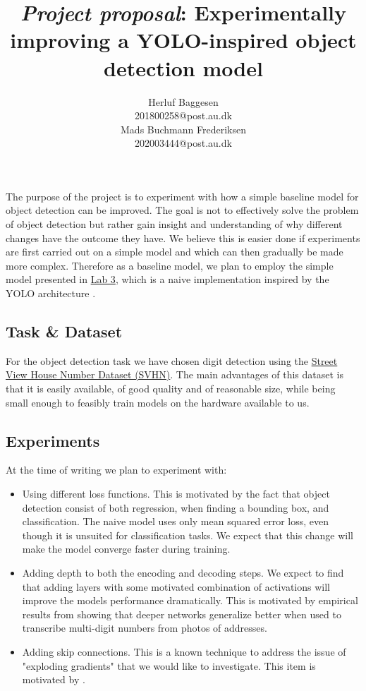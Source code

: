 \documentclass{article}
\title{\emph{Project proposal}: Experimentally improving a YOLO-inspired object detection model}
\author{
	Herluf Baggesen \\
	201800258@post.au.dk \\
	\And
	Mads Buchmann Frederiksen \\
	202003444@post.au.dk\\
}
\date{}
\begin{document}
\maketitle

The purpose of the project is to experiment with how a simple baseline model for object detection can be improved. 
The goal is not to effectively solve the problem of object detection but rather gain insight and understanding of why different changes have the outcome they have. We believe this is easier done if experiments are first carried out on a simple model and which can then gradually be made more complex. 
Therefore as a baseline model, we plan to employ the simple model presented in \href{https://github.com/klaverhenrik/Deep-Learing-for-Visual-Recognition-2022/blob/main/Lab3_FunWithMNIST.ipynb}{Lab 3}, which is a naive implementation inspired by the YOLO architecture \citep{YOLO}.

\subsection{Task \& Dataset}
For the object detection task we have chosen digit detection using the \href{http://ufldl.stanford.edu/housenumbers/}{Street View House Number Dataset (SVHN)}. The main advantages of this dataset is that it is easily available, of good quality and of reasonable size, while being small enough to feasibly train models on the hardware available to us.
\subsection{Experiments}
At the time of writing we plan to experiment with:
\begin{itemize}
\item Using different loss functions. This is motivated by the fact that object detection consist of both regression, when finding a bounding box, and classification. The naive model uses only mean squared error loss, even though it is unsuited for classification tasks. We expect that this change will make the model converge faster during training.
\item Adding depth to both the encoding and decoding steps. We expect to find that adding layers with some motivated combination of activations will improve the models performance dramatically. This is motivated by empirical results from \citep{GOODFELLOW} showing that deeper networks generalize better when used to transcribe multi-digit numbers from photos of addresses. 
\item Adding skip connections. This is a known technique to address the issue of "exploding gradients" that we would like to investigate. This item is motivated by \citep{SGP}.
\end{itemize}
\end{document}
